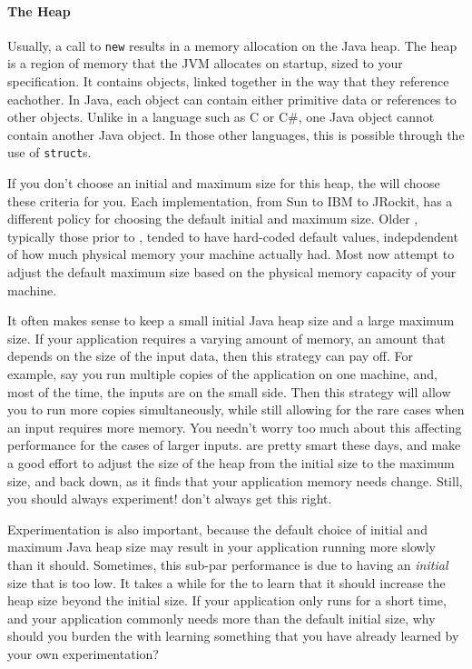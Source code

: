 
\paragraph{The Heap}
Usually, a call to {\tt new} results in a memory allocation on the Java heap.
The heap is a region of memory that the JVM allocates on startup, sized to your
specification. It contains objects, linked together in the way that they
reference eachother. In Java, each object can contain either primitive data or
references to other objects. Unlike in a language such as C or C\#, one Java
object cannot contain another Java object.  In those other languages, this is
possible through the use of {\tt struct}s.

If you don't choose an initial and maximum size for this
heap, the \jre will choose these criteria for you. Each \jre implementation,
from Sun to IBM to JRockit, has a different policy for choosing the default
initial and maximum size. Older \jres, typically those prior to \javafive,
tended to have hard-coded default values, indepdendent of how much physical memory your
machine actually had. Most \jres now attempt to adjust the default
maximum size based on the physical memory capacity of your machine. 

It often makes sense to keep a small initial Java heap size and a large maximum
size.  If your application requires a varying amount of memory, an amount that
depends on the size of the input data, then this strategy can pay off. For
example, say you run multiple copies of the application on one machine, and,
most of the time, the inputs are on the small side. Then this strategy will
allow you to run more copies simultaneously, while still allowing for the rare
cases when an input requires more memory. You needn't worry too much about this
affecting performance for the cases of larger inputs. \jres are pretty smart
these days, and make a good effort to adjust the size of the heap from the
initial size to the maximum size, and back down, as it finds that your
application memory needs change. Still, you should always experiment! \jres
don't always get this right.

Experimentation is also important, because the default choice of initial and
maximum Java heap size may result in your application running more slowly than
it should. Sometimes, this sub-par performance is due to having an
\emph{initial} size that is too low. It takes a while for the \jre to learn that
it should increase the heap size beyond the initial size. If your application
only runs for a short time, and your application commonly needs more than the
default initial size, why should you burden the \jre with learning something
that you have already learned by your own experimentation?

